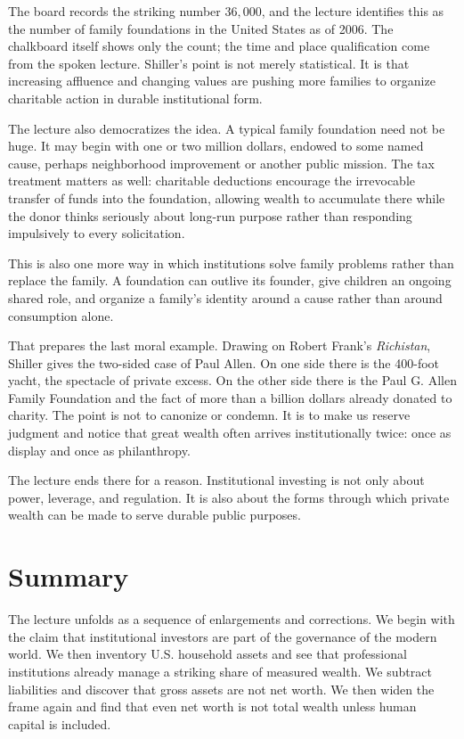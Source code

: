 The board records the striking number \(36{,}000\), and the lecture identifies this as the number of family foundations in the United States as of 2006. The chalkboard itself shows only the count; the time and place qualification come from the spoken lecture. Shiller's point is not merely statistical. It is that increasing affluence and changing values are pushing more families to organize charitable action in durable institutional form.

The lecture also democratizes the idea. A typical family foundation need not be huge. It may begin with one or two million dollars, endowed to some named cause, perhaps neighborhood improvement or another public mission. The tax treatment matters as well: charitable deductions encourage the irrevocable transfer of funds into the foundation, allowing wealth to accumulate there while the donor thinks seriously about long-run purpose rather than responding impulsively to every solicitation.

This is also one more way in which institutions solve family problems rather than replace the family. A foundation can outlive its founder, give children an ongoing shared role, and organize a family's identity around a cause rather than around consumption alone.

That prepares the last moral example. Drawing on Robert Frank's \emph{Richistan}, Shiller gives the two-sided case of Paul Allen. On one side there is the 400-foot yacht, the spectacle of private excess. On the other side there is the Paul G. Allen Family Foundation and the fact of more than a billion dollars already donated to charity. The point is not to canonize or condemn. It is to make us reserve judgment and notice that great wealth often arrives institutionally twice: once as display and once as philanthropy.

The lecture ends there for a reason. Institutional investing is not only about power, leverage, and regulation. It is also about the forms through which private wealth can be made to serve durable public purposes.

\section{Summary}

The lecture unfolds as a sequence of enlargements and corrections. We begin with the claim that institutional investors are part of the governance of the modern world. We then inventory U.S. household assets and see that professional institutions already manage a striking share of measured wealth. We subtract liabilities and discover that gross assets are not net worth. We then widen the frame again and find that even net worth is not total wealth unless human capital is included.

